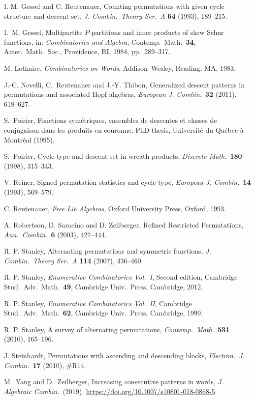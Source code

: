 \documentclass[12pt]{article}
\theoremstyle{definition}
\begin{document}
\begin{thebibliography}{}
 I. M. Gessel and C. Reutenauer, Counting permutations with given cycle structure and descent set, {\it J. Combin.\ Theory Ser.\ A} \textbf{64} (1993), 189--215.

 I.~M. Gessel, Multipartite $P$-partitions and inner products of skew Schur functions, in: \textit{Combinatorics and Algebra}, Contemp.\ Math.\ \textbf{34}, Amer.\ Math.\ Soc., Providence, RI, 1984, pp.\ 289--317.

 M. Lothaire, {\it Combinatorics on Words}, Addison--Wesley, Reading, MA, 1983.

 J.-C. Novelli, C.~Reutenauer and J.-Y. Thibon, Generalized descent patterns in permutations and associated Hopf algebras, {\it European J. Combin.}\ \textbf{32} (2011), 618--627.

 S.~Poirier, Fonctions sym\'etriques, ensembles de descentes et classes de conjugaison dans les produits en couronne, PhD thesis, Universit\'e du Qu\'ebec \`a Montr\'eal (1995).

 S.~Poirier, Cycle type and descent set in wreath products, \textit{Discrete Math.}\ \textbf{180} (1998), 315--343.

 V. Reiner, Signed permutation statistics and cycle type, {\it European J. Combin.}\ \textbf{14} (1993), 569--579. 

 C. Reutenauer, \textit{Free Lie Algebras}, Oxford University Press, Oxford, 1993.  

 A. Robertson, D. Saracino and D. Zeilberger, Refined Restricted Permutations, {\it Ann.\ Combin.}\ \textbf{6} (2003), 427--444.



 R. P. Stanley, Alternating permutations and symmetric functions, {\it J. Combin.\ Theory Ser.\ A} \textbf{114} (2007), 436--460. 

 R. P. Stanley, {\it Enumerative Combinatorics Vol.\ I}, Second edition, Cambridge Stud.\ Adv.\ Math.\ \textbf{49}, Cambridge Univ.\ Press, Cambridge, 2012. 

 R. P. Stanley, {\it Enumerative Combinatorics Vol.\ II}, Cambridge Stud.\ Adv.\ Math.\ \textbf{62}, Cambridge Univ.\ Press, Cambridge, 1999. 

 R. P. Stanley, A survey of alternating permutations, {\it Contemp.\ Math.}\ \textbf{531} (2010), 165--196. 

 J. Steinhardt, Permutations with ascending and descending blocks, {\it Electron.\ J. Combin.}\ \textbf{17} (2010), \#R14.

 M.~Yang and D.~Zeilberger, Increasing consecutive patterns in words, {\it J. Algebraic Combin.}\ (2019), \url{https://doi.org/10.1007/s10801-018-0868-5}.

\end{thebibliography}
\end{document}
